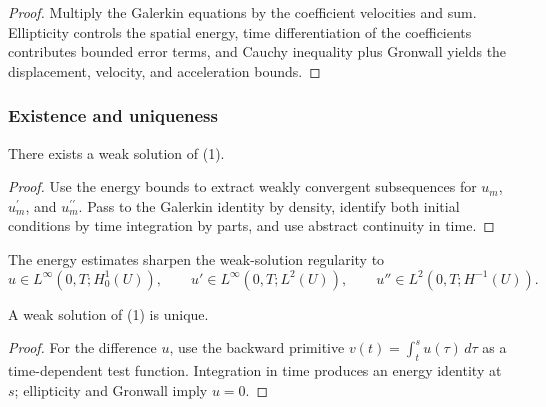 \begin{proof}
\sketch Multiply the Galerkin equations by the coefficient velocities and sum. Ellipticity controls the spatial energy, time differentiation of the coefficients contributes bounded error terms, and Cauchy inequality plus Gronwall yields the displacement, velocity, and acceleration bounds.
\end{proof}

\subsubsection{Existence and uniqueness}

\begin{theorem}
\label{thm:hyperbolic-existence-weak-solution}
There exists a weak solution of (1).
\end{theorem}

\begin{proof}
\sketch Use the energy bounds to extract weakly convergent subsequences for $u_m$, $u_m^{\prime}$, and $u_m^{\prime\prime}$. Pass to the Galerkin identity by density, identify both initial conditions by time integration by parts, and use abstract continuity in time.
\end{proof}

\begin{remark}
\label{rem:hyperbolic-existence-remark}
The energy estimates sharpen the weak-solution regularity to
\[
u\in L^\infty(0,T;H_0^1(U)),\qquad
u'\in L^\infty(0,T;L^2(U)),\qquad
u''\in L^2(0,T;H^{-1}(U)).
\]
\end{remark}

\begin{theorem}
\label{thm:hyperbolic-uniqueness-weak-solution}
A weak solution of (1) is unique.
\end{theorem}

\begin{proof}
\sketch For the difference $u$, use the backward primitive $v(t)=\int_t^s u(\tau)\,d\tau$ as a time-dependent test function. Integration in time produces an energy identity at $s$; ellipticity and Gronwall imply $u=0$.
\end{proof}

